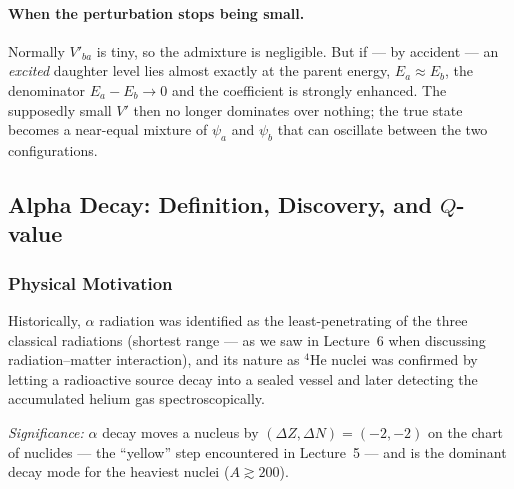 \paragraph{When the perturbation stops being small.}
Normally $V'_{ba}$ is tiny, so the admixture is negligible.  But if --- by
accident --- an \emph{excited} daughter level lies almost exactly at the parent
energy, $E_a \approx E_b$, the denominator $E_a-E_b\to0$ and the coefficient is
strongly enhanced.  The supposedly small $V'$ then no longer dominates over
nothing; the true state becomes a near-equal mixture of $\psi_a$ and $\psi_b$
that can oscillate between the two configurations.

\subsection{Alpha Decay: Definition, Discovery, and $Q$-value}
\label{subsec:lec08:alpha_def}

\subsubsection*{Physical Motivation}
Historically, $\alpha$ radiation was identified as the least-penetrating of the
three classical radiations (shortest range --- as we saw in Lecture~6 when
discussing radiation--matter interaction), and its nature as $^4$He nuclei was
confirmed by letting a radioactive source decay into a sealed vessel and later
detecting the accumulated helium gas spectroscopically.

\textit{Significance:} $\alpha$ decay moves a nucleus by $(\Delta Z,\Delta N)=(-2,-2)$
on the chart of nuclides --- the ``yellow'' step encountered in
Lecture~5 --- and is the dominant decay mode for the heaviest nuclei
($A \gtrsim 200$).

